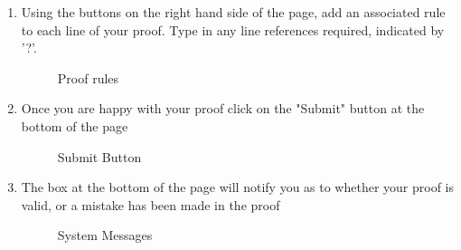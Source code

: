 \begin{enumerate}
		\item Using the buttons on the right hand side of the page, add an associated rule to each line of your proof. Type in any line references required, indicated by '?'.
			\begin{figure}[!ht]
				\centering
				\caption{Proof rules}
			\end{figure}
		
		\item Once you are happy with your proof click on the "Submit" button at the bottom of the page
			\begin{figure}[!ht]
				\centering
				\caption{Submit Button}
			\end{figure}
		
		\item The box at the bottom of the page will notify you as to whether your proof is valid, or a mistake has been made in the proof
		\begin{figure}[!ht]
			\centering
			\caption{System Messages}
		\end{figure}
	

\end{enumerate}
